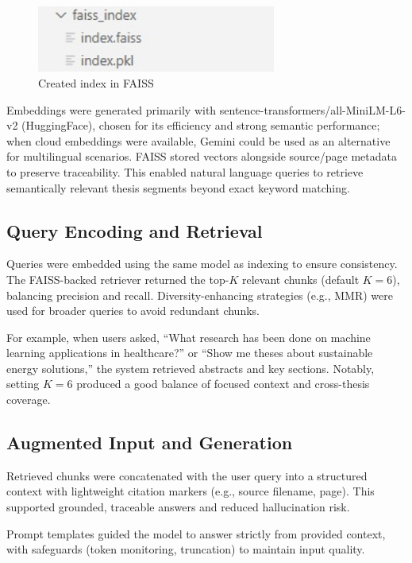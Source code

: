 \begin{refsection}
\begin{figure}[h]
    \centering
    \includegraphics[width=0.7\textwidth]{figures/index.jpg}
    \caption{Created index in FAISS}
\end{figure}

Embeddings were generated primarily with sentence-transformers/all-MiniLM-L6-v2 (HuggingFace), chosen for its efficiency and strong semantic performance; when cloud embeddings were available, Gemini could be used as an alternative for multilingual scenarios. FAISS stored vectors alongside source/page metadata to preserve traceability. This enabled natural language queries to retrieve semantically relevant thesis segments beyond exact keyword matching.

\subsection{Query Encoding and Retrieval}
Queries were embedded using the same model as indexing to ensure consistency. The FAISS-backed retriever returned the top-$K$ relevant chunks (default $K=6$), balancing precision and recall. Diversity-enhancing strategies (e.g., MMR) were used for broader queries to avoid redundant chunks.

For example, when users asked, “What research has been done on machine learning applications in healthcare?” or “Show me theses about sustainable energy solutions,” the system retrieved abstracts and key sections.  Notably, setting $K=6$ produced a good balance of focused context and cross-thesis coverage.

\subsection{Augmented Input and Generation}
Retrieved chunks were concatenated with the user query into a structured context with lightweight citation markers (e.g., source filename, page). This supported grounded, traceable answers and reduced hallucination risk.

Prompt templates guided the model to answer strictly from provided context, with safeguards (token monitoring, truncation) to maintain input quality.


\end{refsection}
